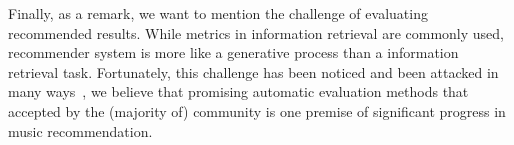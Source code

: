Finally, as a remark, we want to mention the challenge of evaluating recommended results.
While metrics in information retrieval are commonly used, recommender system is more like a generative process
than a information retrieval task. Fortunately, this challenge has been noticed and been attacked in many 
ways~\cite{mcfee2011natural,mcfee2012hypergraph,schedl2017}, 
we believe that promising automatic evaluation methods that accepted by the (majority of) 
community is one premise of significant progress in music recommendation.




